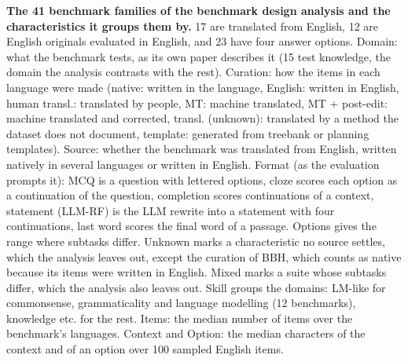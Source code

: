 \begin{table}[p]
\centering
\small
\begin{adjustbox}{max width=\textwidth}

\end{adjustbox}
\caption{\textbf{The 41 benchmark families of the benchmark design analysis and the characteristics it groups them by.} 17 are translated from English, 12 are English originals evaluated in English, and 23 have four answer options. Domain: what the benchmark tests, as its own paper describes it (15 test knowledge, the domain the analysis contrasts with the rest). Curation: how the items in each language were made (native: written in the language, English: written in English, human transl.: translated by people, MT: machine translated, MT + post-edit: machine translated and corrected, transl. (unknown): translated by a method the dataset does not document, template: generated from treebank or planning templates). Source: whether the benchmark was translated from English, written natively in several languages or written in English. Format (as the evaluation prompts it): MCQ is a question with lettered options, cloze scores each option as a continuation of the question, completion scores continuations of a context, statement (LLM-RF) is the LLM rewrite into a statement with four continuations, last word scores the final word of a passage. Options gives the range where subtasks differ. Unknown marks a characteristic no source settles, which the analysis leaves out, except the curation of BBH, which counts as native because its items were written in English. Mixed marks a suite whose subtasks differ, which the analysis also leaves out. Skill groups the domains: LM-like for commonsense, grammaticality and language modelling (12 benchmarks), knowledge etc. for the rest. Items: the median number of items over the benchmark's languages. Context and Option: the median characters of the context and of an option over 100 sampled English items.}
\label{tab:app_rq09_benchmark_characteristics}
\end{table}
